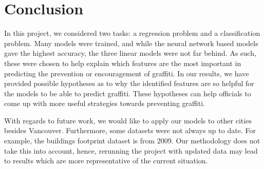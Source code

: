 \chapter{Conclusion}

In this project, we considered two tasks: a regression problem and a classification problem. Many models were trained, and while the neural network based models gave the highest accuracy, the three linear models were not far behind. As such, these were chosen to help explain which features are the most important in predicting the prevention or encouragement of graffiti. In our results, we have provided possible hypotheses as to why the identified features are so helpful for the models to be able to predict graffiti. These hypotheses can help officials to come up with more useful strategies towards preventing graffiti.

With regards to future work, we would like to apply our models to other cities besides Vancouver. Furthermore, some datasets were not always up to date. For example, the buildings footprint dataset is from 2009. Our methodology does not take this into account, hence, rerunning the project with updated data may lead to results which are more representative of the current situation.
